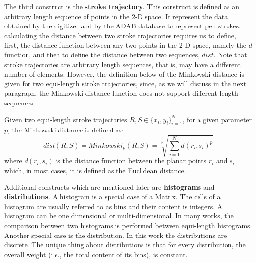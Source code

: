 \iftoggle{edit-mode}{\hspace{0pt}\marginpar{Stroke trajectory}}{}
The third construct is the \textbf{stroke trajectory}. This construct is defined as an arbitrary length sequence of points in the 2-D space. It represent the data obtained by the digitizer and by the ADAB database to represent pen strokes. calculating the distance between two stroke trajectories requires us to define, first, the distance function between any two points in the 2-D space, namely the $d$ function, and then to define the distance between two sequences, $dist$. Note that stroke trajectories are arbitrary length sequences, that is, may have a different number of elements. However, the definition below of the Minkowski distance is given for two equi-length stroke trajectories, since, as we will discuss in the next paragraph, the Minkowski distance function does not support different length sequences.
\begin{definition}
Given two equi-length stroke trajectories $R,S \in \{x_i,y_i\}_{i=1}^{N}$, for a given parameter $p$, the Minkowski distance is defined as:
\begin{equation}
dist(R,S)=Minkowski_p(R,S)=\sqrt[p]{\sum\limits_{i=1}^N d(r_i,s_i)^p}
\end{equation}
where $d(r_i,s_i)$ is the distance function between the planar points $r_i$ and $s_i$ which, in most cases, it is defined as the Euclidean distance.
\end{definition}

\iftoggle{edit-mode}{\hspace{0pt}\marginpar{Histograms and distributions}}{}
Additional constructs which are mentioned later are \textbf{histograms} and \textbf{distributions}. A histogram is a special case of a Matrix. The cells of a histogram are usually referred to as bins and their content is integers. A histogram can be one dimensional or multi-dimensional. In many works, the comparison between two histograms is performed between equi-length histograms.
Another special case is the distribution. In this work the distributions are discrete. The unique thing about distributions is that for every distribution, the overall weight (i.e., the total content of its bins), is constant.

